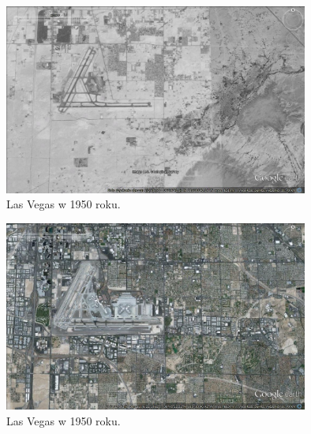 \begin{figure}[H]
  \centering
    \includegraphics[width=100mm]{ge/02_1977.jpg}
  \caption{Las Vegas w 1950 roku.}
  \label{fig:lasVegas2}
\end{figure}

\begin{figure}[H]
  \centering
    \includegraphics[width=100mm]{ge/03_2012.jpg}
  \caption{Las Vegas w 1950 roku.}
  \label{fig:lasVegas3}
\end{figure}



